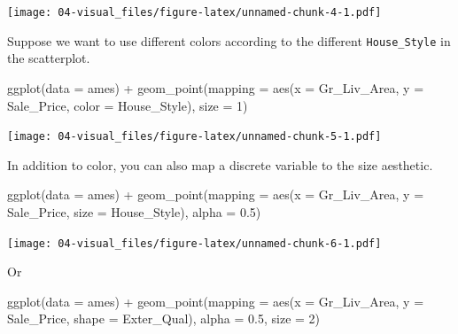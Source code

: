 \documentclass[
]{book}
\newenvironment{Shaded}{\begin{snugshade}}{\end{snugshade}}
\newcommand{\AttributeTok}[1]{\textcolor[rgb]{0.77,0.63,0.00}{#1}}
\newcommand{\DecValTok}[1]{\textcolor[rgb]{0.00,0.00,0.81}{#1}}
\newcommand{\FloatTok}[1]{\textcolor[rgb]{0.00,0.00,0.81}{#1}}
\newcommand{\FunctionTok}[1]{\textcolor[rgb]{0.00,0.00,0.00}{#1}}
\newcommand{\NormalTok}[1]{#1}
\newcommand{\SpecialCharTok}[1]{\textcolor[rgb]{0.00,0.00,0.00}{#1}}
\begin{document}
\texttt{[image: 04-visual\_files/figure-latex/unnamed-chunk-4-1.pdf]}

Suppose we want to use different colors according to the different \texttt{House\_Style} in the scatterplot.

\begin{Shaded}
\begin{Highlighting}[]
\FunctionTok{ggplot}\NormalTok{(}\AttributeTok{data =}\NormalTok{ ames) }\SpecialCharTok{+} 
  \FunctionTok{geom\_point}\NormalTok{(}\AttributeTok{mapping =} \FunctionTok{aes}\NormalTok{(}\AttributeTok{x =}\NormalTok{ Gr\_Liv\_Area, }
                           \AttributeTok{y =}\NormalTok{ Sale\_Price, }
                           \AttributeTok{color =}\NormalTok{ House\_Style), }
             \AttributeTok{size =} \DecValTok{1}\NormalTok{)}
\end{Highlighting}
\end{Shaded}

\texttt{[image: 04-visual\_files/figure-latex/unnamed-chunk-5-1.pdf]}

In addition to color, you can also map a discrete variable to the size aesthetic.

\begin{Shaded}
\begin{Highlighting}[]
\FunctionTok{ggplot}\NormalTok{(}\AttributeTok{data =}\NormalTok{ ames) }\SpecialCharTok{+} 
  \FunctionTok{geom\_point}\NormalTok{(}\AttributeTok{mapping =} \FunctionTok{aes}\NormalTok{(}\AttributeTok{x =}\NormalTok{ Gr\_Liv\_Area, }
                           \AttributeTok{y =}\NormalTok{ Sale\_Price, }
                           \AttributeTok{size =}\NormalTok{ House\_Style), }
             \AttributeTok{alpha =} \FloatTok{0.5}\NormalTok{)}
\end{Highlighting}
\end{Shaded}

\texttt{[image: 04-visual\_files/figure-latex/unnamed-chunk-6-1.pdf]}

Or

\begin{Shaded}
\begin{Highlighting}[]
\FunctionTok{ggplot}\NormalTok{(}\AttributeTok{data =}\NormalTok{ ames) }\SpecialCharTok{+} 
  \FunctionTok{geom\_point}\NormalTok{(}\AttributeTok{mapping =} \FunctionTok{aes}\NormalTok{(}\AttributeTok{x =}\NormalTok{ Gr\_Liv\_Area, }
                           \AttributeTok{y =}\NormalTok{ Sale\_Price, }
                           \AttributeTok{shape =}\NormalTok{ Exter\_Qual), }
             \AttributeTok{alpha =} \FloatTok{0.5}\NormalTok{,}
             \AttributeTok{size =} \DecValTok{2}\NormalTok{)}
\end{Highlighting}
\end{Shaded}
\end{document}
